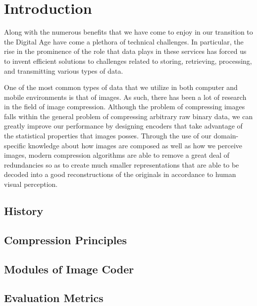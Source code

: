\documentclass[review,onefignum,onetabnum]{siamart190516}
\begin{document}
\maketitle

\begin{abstract}
  \lipsum[1]
\end{abstract}

\section{Introduction}
Along with the numerous benefits that we have come to enjoy in our transition to the Digital Age
have come a plethora of technical challenges. In particular, the rise in the prominence
of the role that data plays in these services has forced us to invent efficient solutions 
to challenges related to storing, retrieving, processing, and transmitting various types of 
data.

One of the most common types of data that we utilize in both computer and mobile environments
is that of images. As such, there has been a lot of research in the field of image compression.
Although the problem of compressing images falls within the general problem of compressing arbitrary
raw binary data, we can greatly improve our performance by designing encoders that take 
advantage of the statistical properties that images posses. Through the use of our domain-specific
knowledge about how images are composed as well as how we perceive images, 
modern compression algorithms are able to remove a great deal of redundancies
so as to create much smaller representations that are able to be decoded into a 
good reconstructions of the originals in accordance to human visual perception.

\subsection{History}


\subsection{Compression Principles}
\lipsum[5-6]

\subsection{Modules of Image Coder}
\lipsum[6-9]

\subsection{Evaluation Metrics}
\lipsum[10-11]
\end{document}
